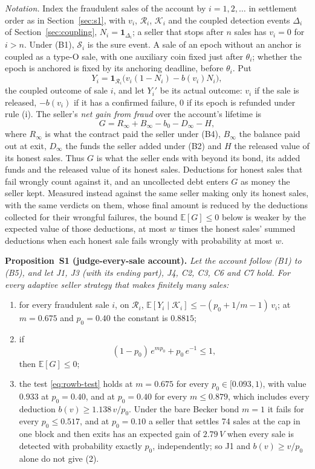 \documentclass[10pt,a4paper]{article}
\newcommand{\E}{\mathbb{E}}
\newcommand{\cK}{\mathcal{K}}
\newcommand{\cR}{\mathcal{R}}
\newcommand{\cS}{\mathcal{S}}
\newcommand{\one}{\mathbf{1}}
\theoremstyle{plain}
\theoremstyle{remark}
\begin{document}
\emph{Notation.} Index the fraudulent sales of the account by $i=1,2,\dots$ in settlement order as in Section~\ref{sec:s1}, with $v_i$, $\cR_i$, $\cK_i$ and the coupled detection events $\Delta_i$ of Section~\ref{sec:coupling}, $N_i=\one_{\Delta_i}$; a seller that stops after $n$ sales has $v_i=0$ for $i>n$. Under (B1), $\cS_i$ is the sure event. A sale of an epoch without an anchor is coupled as a type-O sale, with one auxiliary coin fixed just after $\theta_i$; whether the epoch is anchored is fixed by its anchoring deadline, before $\theta_i$. Put
\[
Y_i=\one_{\cR_i}\big(v_i(1-N_i)-b(v_i)N_i\big),
\]
the coupled outcome of sale $i$, and let $Y_i'$ be its actual outcome: $v_i$ if the sale is released, $-b(v_i)$ if it has a confirmed failure, $0$ if its epoch is refunded under rule (i). The seller's \emph{net gain from fraud} over the account's lifetime is
\[
G=R_\infty+B_\infty-b_0-D_\infty-H,
\]
where $R_\infty$ is what the contract paid the seller under (B4), $B_\infty$ the balance paid out at exit, $D_\infty$ the funds the seller added under (B2) and $H$ the released value of its honest sales. Thus $G$ is what the seller ends with beyond its bond, its added funds and the released value of its honest sales. Deductions for honest sales that fail wrongly count against it, and an uncollected debt enters $G$ as money the seller kept. Measured instead against the same seller making only its honest sales, with the same verdicts on them, whose final amount is reduced by the deductions collected for their wrongful failures, the bound $\E[G]\le0$ below is weaker by the expected value of those deductions, at most $w$ times the honest sales' summed deductions when each honest sale fails wrongly with probability at most $w$.

\begin{trivlist}\item \textbf{Proposition~S1 (judge-every-sale account).} \itshape Let the account follow (B1) to (B5), and let J1, J3 (with its ending part), J4, C2, C3, C6 and C7 hold. For every adaptive seller strategy that makes finitely many sales:
\begin{enumerate}[label=(\arabic*),leftmargin=2em]
\item for every fraudulent sale $i$, on $\cR_i$,
$\E[Y_i\mid\cK_i]\le-(p_0+1/m-1)\,v_i$; at $m=0.675$ and $p_0=0.40$ the constant is $0.8815$;
\item if
\begin{equation}\tag{T}\label{eq:rowb-test}
(1-p_0)\,e^{m p_0}+p_0\,e^{-1}\le1,
\end{equation}
then $\E[G]\le0$;
\item the test \eqref{eq:rowb-test} holds at $m=0.675$ for every $p_0\in[0.093,1)$, with value $0.933$ at $p_0=0.40$, and at $p_0=0.40$ for every $m\le0.879$, which includes every deduction $b(v)\ge1.138\,v/p_0$. Under the bare Becker bond $m=1$ it fails for every $p_0\le0.517$, and at $p_0=0.10$ a seller that settles 74 sales at the cap in one block and then exits has an expected gain of $2.79\,V$ when every sale is detected with probability exactly $p_0$, independently; so J1 and $b(v)\ge v/p_0$ alone do not give (2).
\end{enumerate}
\end{trivlist}
\end{document}
